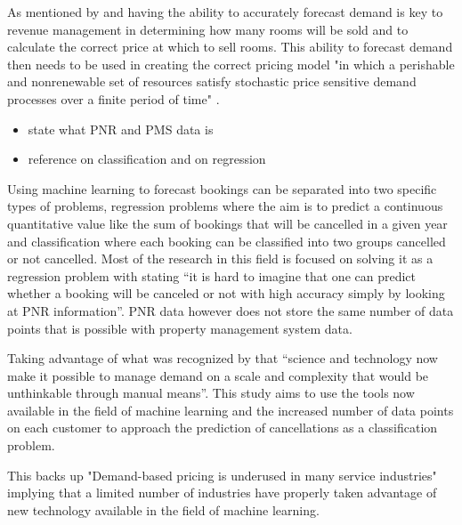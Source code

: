 \vspace{5mm}

As mentioned by \cite{RevenueWorldCat.org} and \cite{Weatherford2003AManagement} having the ability to accurately forecast demand is key to revenue management in determining how many rooms will be sold and to calculate the correct price at which to sell rooms. This ability to forecast demand then needs to be used in creating the correct pricing model "in which a perishable and nonrenewable set of resources satisfy stochastic price sensitive demand processes over a finite period of time" \cite{Bitran2003AnManagement}.

\vspace{5mm}

\begin{itemize}
\item state what PNR and PMS data is
\item reference on classification and on regression
\end{itemize}


Using machine learning to forecast bookings can be separated into two specific types of problems, regression problems where the aim is to predict a continuous quantitative value like the sum of bookings that will be cancelled in a given year and classification where each booking can be classified into two groups cancelled or not cancelled. Most of the research in this field is focused on solving it as a regression problem with  \cite{RomeroMorales2010ForecastingMining} stating “it is hard to imagine that one can predict whether a booking will be canceled or not with high accuracy simply by looking at PNR information”. PNR data however does not store the same number of data points that is possible with property management system data.

\vspace{5mm}

Taking advantage of what was recognized by \cite{Talluri2004TheManagement} that “science and technology now make it possible to manage demand on a scale and complexity that would be unthinkable through manual means”.  This study aims to use the tools now available in the field of machine learning and the increased number of data points on each customer to approach the prediction of cancellations as a classification problem.   

This backs up "Demand-based pricing is underused in many service industries" \cite{Kimes2003HasAcceptable} implying that a limited number of industries have properly taken advantage of new technology available in the field of machine learning.

